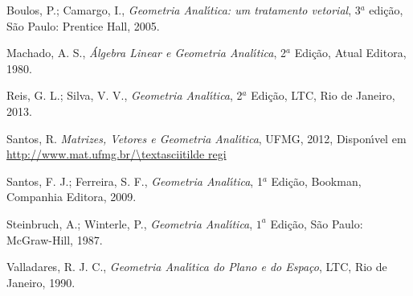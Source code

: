 \cleardoublepage
{}
{}
\renewcommand{\bibname}{Bibliografia}

\begin{thebibliography}{99}

Boulos, P.; Camargo, I., \textit{Geometria Anal{\'\i}tica: um tratamento vetorial}, 3$^a$ edi\c{c}\~ao, S\~ao Paulo: Prentice Hall, 2005.

Machado, A. S., \textit{\'Algebra Linear e Geometria Anal{\'\i}tica}, 2$^a$ Edi{\c c}{\~a}o, Atual Editora, 1980.

Reis, G. L.; Silva, V. V., \textit{Geometria Anal{\'\i}tica}, 2$^a$ Edi\c{c}\~ao, LTC, Rio de Janeiro, 2013.

Santos, R. \textit{Matrizes, Vetores e Geometria Anal{\'\i}tica}, UFMG, 2012, Dispon{\'\i}vel em \url{http://www.mat.ufmg.br/\textasciitilde regi}

Santos, F. J.; Ferreira, S. F., \textit{Geometria Anal{\'\i}tica}, 1$^{a}$ Edi{\c c}{\~a}o, Bookman, Companhia Editora, 2009.

Steinbruch, A.; Winterle, P., \textit{Geometria Anal{\'\i}tica}, $1^a$ Edi{\c c}{\~a}o, S\~ao Paulo: McGraw-Hill, 1987.

Valladares, R. J. C., \textit{Geometria Anal{\'\i}tica do Plano e do Espa\c{c}o}, LTC, Rio de Janeiro, 1990.

\end{thebibliography}